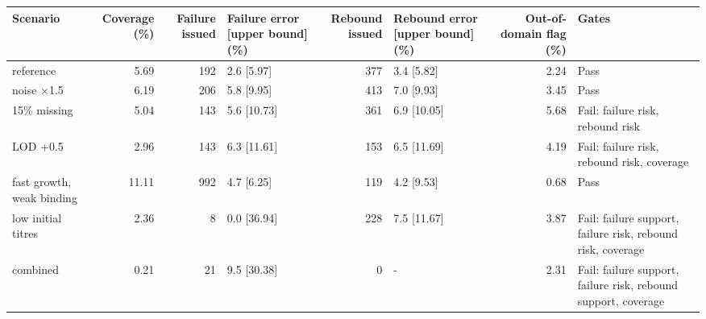 \begin{tabular}{lrrlrlrl}
\toprule
Scenario & Coverage (\%) & Failure issued & Failure error [upper bound] (\%) & Rebound issued & Rebound error [upper bound] (\%) & Out-of-domain flag (\%) & Gates \\
\midrule
reference & 5.69 & 192 & 2.6 [5.97] & 377 & 3.4 [5.82] & 2.24 & Pass \\
noise ×1.5 & 6.19 & 206 & 5.8 [9.95] & 413 & 7.0 [9.93] & 3.45 & Pass \\
15\% missing & 5.04 & 143 & 5.6 [10.73] & 361 & 6.9 [10.05] & 5.68 & Fail: failure risk, rebound risk \\
LOD +0.5 & 2.96 & 143 & 6.3 [11.61] & 153 & 6.5 [11.69] & 4.19 & Fail: failure risk, rebound risk, coverage \\
fast growth, weak binding & 11.11 & 992 & 4.7 [6.25] & 119 & 4.2 [9.53] & 0.68 & Pass \\
low initial titres & 2.36 & 8 & 0.0 [36.94] & 228 & 7.5 [11.67] & 3.87 & Fail: failure support, failure risk, rebound risk, coverage \\
combined & 0.21 & 21 & 9.5 [30.38] & 0 & - & 2.31 & Fail: failure support, failure risk, rebound support, coverage \\
\bottomrule
\end{tabular}
